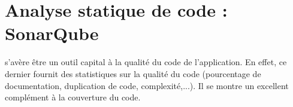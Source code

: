 \section{Analyse statique de code : SonarQube}
 s'avère être un outil capital à la qualité du code de l'application. En effet, ce dernier fournit des statistiques sur la qualité du code (pourcentage de documentation, duplication de code, complexité,...). Il se montre un excellent complément à la couverture du code.  